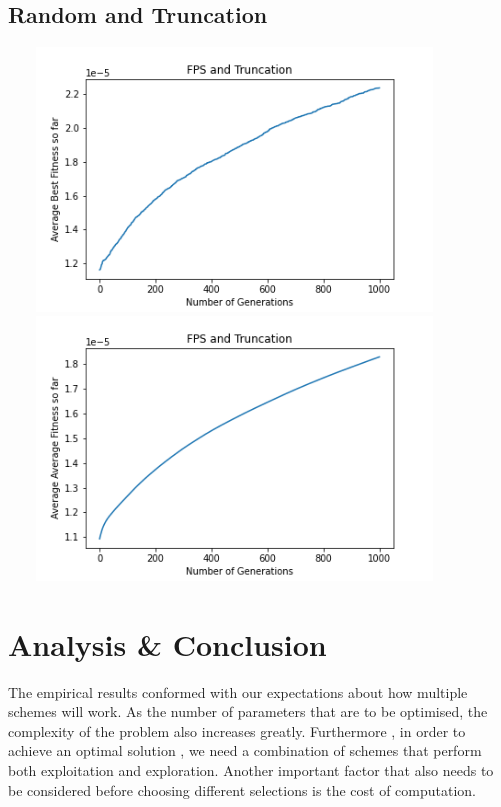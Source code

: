 \documentclass[a4paper]{article}
\begin{document}
\subsection{Random and Truncation}
\includegraphics[width=12cm, height=7cm]{Graphs/TSP/fps_trunc_bsf.png} \\
\includegraphics[width=12cm, height=7cm]{Graphs/TSP/fps_trunc_avg.png} \\

\section{Analysis \& Conclusion}
The empirical results conformed with our expectations about how multiple schemes will work. As the number of parameters that are to be optimised, the complexity of the problem also increases greatly. Furthermore , in order to achieve an optimal solution , we need a combination of schemes that perform both exploitation and exploration. Another important factor that also needs to be considered before choosing different selections is the cost of computation.  
\end{document}
